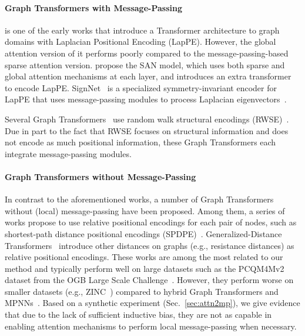 \documentclass[nohyperref, dvipsnames]{article}
\theoremstyle{plain}
\theoremstyle{definition}
\theoremstyle{remark}
\begin{document}
\paragraph{Graph Transformers with Message-Passing}

\citet{dwivedi2021GeneralizationTransformerNetworks} is one of the early works that introduce a Transformer architecture to graph domains with Laplacian Positional Encoding (LapPE).
However, the global attention version of it performs poorly compared to the message-passing-based sparse attention version.
\citet{kreuzer2021RethinkingGraphTransformers} propose the SAN model, which uses both sparse and global attention mechanisms at each layer, 
and introduces an extra transformer to encode LapPE. 
SignNet~\citep{lim2022SignBasisInvariant} is a specialized symmetry-invariant encoder for LapPE that uses message-passing modules to process Laplacian eigenvectors~\citep{lim2022SignBasisInvariant, rampasek2022RecipeGeneralPowerful}.

Several Graph Transformers~\cite{chen2022StructureAwareTransformerGraph, rampasek2022RecipeGeneralPowerful} use random walk structural encodings (RWSE)~\cite{dwivedi2021GraphNeuralNetworks}. 
Due in part to the fact that RWSE focuses on structural information and does not encode as much positional information,
these Graph Transformers each integrate message-passing modules.


\paragraph{Graph Transformers without Message-Passing}

In contrast to the aforementioned works, a number of Graph Transformers without (local) message-passing have been proposed. 
Among them, a series of works propose to use relative positional encodings for each pair of nodes, such as shortest-path distance positional encodings (SPDPE)~\cite{ying2021TransformersReallyPerform, park2022GRPERelativePositional, luo2022your}.
Generalized-Distance Transformers~\cite{zhang2023rethinking}  introduce other distances on graphs (e.g., resistance distances) as relative positional encodings.  
These works are among the most related to our method and typically perform well on large datasets such as the PCQM4Mv2 dataset from the OGB Large Scale Challenge~\cite{hu2021ogblsc}.
However, they perform worse on smaller datasets (e.g., ZINC~\cite{dwivedi2020BenchmarkingGraphNeural}) compared to hybrid Graph Transformers and MPNNs~\cite{rampasek2022RecipeGeneralPowerful}. 
Based on a synthetic experiment (Sec.~\ref{sec:attn2mp}), we give evidence that due to the lack of sufficient inductive bias, they are not as capable in enabling attention mechanisms to perform local message-passing when necessary.
\end{document}
